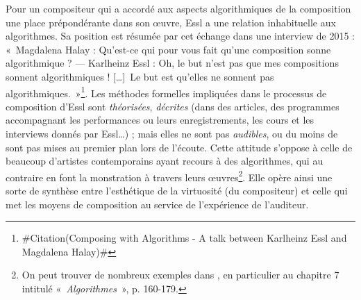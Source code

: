 \documentclass[a4paper,12pt]{article}
\newcommand{\guill}[1]{«~#1~»}
\newcommand{\zitat}[2]{\#Citation(#2)\#}
\newcommand{\tpp}[0]{[\dots]}
\begin{document}
Pour un compositeur qui a accordé aux aspects algorithmiques de la composition une place prépondérante dans son œuvre, Essl a une relation inhabituelle aux algorithmes. Sa position est résumée par cet échange dans une interview de 2015 : \guill{Magdalena Halay : Qu'est-ce qui pour vous fait qu'une composition sonne algorithmique ? --- Karlheinz Essl : Oh, le but n'est pas que mes compositions sonnent algorithmiques ! \tpp~Le but est qu'elles ne sonnent pas algorithmiques.}\footnote{\zitat{MH: What makes an algorithmic composition sound algorithmic to you?
KHE: Oh, it's not the point that it sounds algorithmic! Maybe this is a big misunderstanding [laughs]. The point is that it must not sound "algorithmic", you know? [Laughs]}
{Composing with Algorithms - A talk between Karlheinz Essl and Magdalena Halay}}.
Les méthodes formelles impliquées dans le processus de composition d'Essl sont \emph{théorisées}, \emph{décrites} (dans des articles, des programmes accompagnant les performances ou leurs enregistrements, les cours et les interviews donnés par Essl\dots) ; mais elles ne sont pas \emph{audibles}, ou du moins de sont pas mises au premier plan lors de l'écoute. Cette attitude s'oppose à celle de beaucoup d'artistes contemporains ayant recours à des algorithmes, qui au contraire en font la monstration à travers leurs œuvres\footnote{On peut trouver de nombreux exemples dans \cite{wilson2012artscience}, en particulier au chapitre 7 intitulé \guill{\emph{Algorithmes}}, p. 160-179.}. Elle opère ainsi une sorte de synthèse entre l'esthétique de la virtuosité (du compositeur) et celle qui met les moyens de composition au service de l'expérience de l'auditeur.

\end{document}
